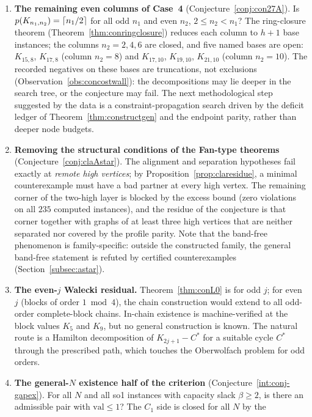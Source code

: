 \begin{enumerate}[label=\textbf{O\arabic*.},leftmargin=2.4em]
\item \textbf{The remaining even columns of Case~4}
(Conjecture~\ref{conj:con27A}). Is
$p(K_{n_1,n_2})=\lceil n_1/2\rceil$ for all odd $n_1$ and even $n_2$,
$2\le n_2<n_1$? The ring-closure theorem
(Theorem~\ref{thm:conringclosure}) reduces each column to $h+1$ base
instances; the columns $n_2=2,4,6$ are closed, and five named bases are
open: $K_{15,8}$, $K_{17,8}$ (column $n_2=8$) and $K_{17,10}$,
$K_{19,10}$, $K_{21,10}$ (column $n_2=10$). The recorded negatives on
these bases are truncations, not exclusions
(Observation~\ref{obs:concostwall}): the decompositions may lie deeper in
the search tree, or the conjecture may fail. The next methodological step
suggested by the data is a constraint-propagation search driven by the
deficit ledger of Theorem~\ref{thm:constructgen} and the endpoint parity,
rather than deeper node budgets.
\item \textbf{Removing the structural conditions of the Fan-type
theorems} (Conjecture~\ref{conj:claAstar}). The alignment and separation
hypotheses fail exactly at \emph{remote high vertices}; by
Proposition~\ref{prop:claresidue}, a minimal counterexample must have a
bad partner at every high vertex. The remaining corner of the two-high
layer is blocked by the excess bound (zero violations on all $235$
computed instances), and the residue of the conjecture is that corner
together with graphs of at least three high vertices that are neither
separated nor covered by the profile parity. Note that the band-free
phenomenon is family-specific: outside the constructed family, the
general band-free statement is refuted by certified counterexamples
(Section~\ref{subsec:astar}).
\item \textbf{The even-$j$ Walecki residual.} Theorem~\ref{thm:conL0} is
for odd $j$; for even $j$ (blocks of order $1\bmod4$), the chain
construction would extend to all odd-order complete-block chains. In-chain
existence is machine-verified at the block values $K_5$ and $K_9$, but no
general construction is known. The natural route is a Hamilton
decomposition of $K_{2j+1}-C^*$ for a suitable cycle $C^*$ through the
prescribed path, which touches the Oberwolfach problem for odd orders.
\item \textbf{The general-$N$ existence half of the criterion}
(Conjecture~\ref{int:conj-gapex}). For all $N$ and all so1 instances with
capacity slack $\beta\ge2$, is there an admissible pair with
$\mathrm{val}\le1$? The $C_1$ side is closed for all $N$ by the

\end{enumerate}

